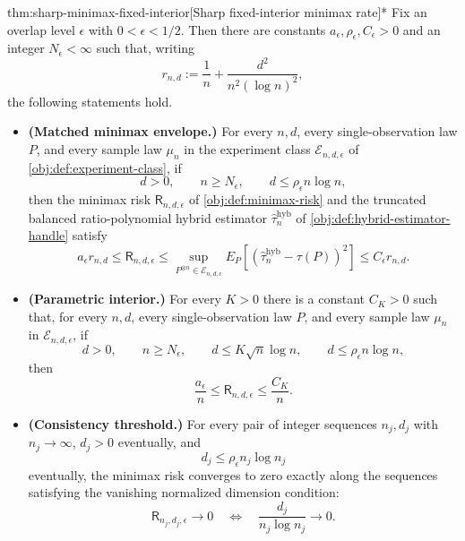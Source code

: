 \begin{theoremv}{thm:sharp-minimax-fixed-interior}[Sharp fixed-interior minimax rate]*
Fix an overlap level \(\epsilon\) with \(0<\epsilon<1/2\).  Then there are constants
\(a_\epsilon,\rho_\epsilon,C_\epsilon>0\) and an integer \(N_\epsilon<\infty\) such that, writing
\[
r_{n,d}:=\frac1n+\frac{d^2}{n^2(\log n)^2},
\]
the following statements hold.
\begin{itemize}
\item \textbf{(Matched minimax envelope.)} For every \(n,d\), every single-observation law \(P\), and every sample law \(\mu_n\) in the experiment class \(\mathcal E_{n,d,\epsilon}\) of \cref{obj:def:experiment-class}, if
\[
d>0,\qquad n\ge N_\epsilon,\qquad d\le \rho_\epsilon n\log n,
\]
then the minimax risk \(\mathsf R_{n,d,\epsilon}\) of \cref{obj:def:minimax-risk} and the truncated balanced ratio-polynomial hybrid estimator \(\widehat\tau_n^{\mathrm{hyb}}\) of \cref{obj:def:hybrid-estimator-handle} satisfy
\[
a_\epsilon r_{n,d}
\le
\mathsf R_{n,d,\epsilon}
\le
\sup_{P^{\otimes n}\in\mathcal E_{n,d,\epsilon}}
E_P\!\left[\left(\widehat\tau_n^{\mathrm{hyb}}-\tau(P)\right)^2\right]
\le
C_\epsilon r_{n,d}.
\]
\item \textbf{(Parametric interior.)} For every \(K>0\) there is a constant \(C_K>0\) such that, for every \(n,d\), every single-observation law \(P\), and every sample law \(\mu_n\) in \(\mathcal E_{n,d,\epsilon}\), if
\[
d>0,\qquad n\ge N_\epsilon,\qquad
d\le K\sqrt n\log n,\qquad
d\le \rho_\epsilon n\log n,
\]
then
\[
\frac{a_\epsilon}{n}
\le
\mathsf R_{n,d,\epsilon}
\le
\frac{C_K}{n}.
\]
\item \textbf{(Consistency threshold.)} For every pair of integer sequences \(n_j,d_j\) with \(n_j\to\infty\), \(d_j>0\) eventually, and
\[
d_j\le \rho_\epsilon n_j\log n_j
\]
eventually, the minimax risk converges to zero exactly along the sequences satisfying the vanishing normalized dimension condition:
\[
\mathsf R_{n_j,d_j,\epsilon}\to 0
\quad\Longleftrightarrow\quad
\frac{d_j}{n_j\log n_j}\to 0.
\]
\end{itemize}
\end{theoremv}


